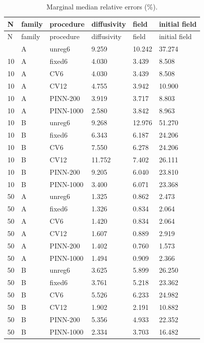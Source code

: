 \documentclass[10pt,a4paper]{article}
\begin{document}
\begingroup\small
\setlength{\tabcolsep}{3pt}
\begin{longtable}{@{}p{}p{}p{}p{}p{}p{}@{}}
\caption{Marginal median relative errors (\%).}\label{tab:1}\\
\toprule
N & family & procedure & diffusivity & field & initial field \\
\midrule\endfirsthead
\toprule
N & family & procedure & diffusivity & field & initial field \\
\midrule\endhead
\bottomrule\endfoot
10 & A & unreg6 & 9.259 & 10.242 & 37.274 \\
10 & A & fixed6 & 4.030 & 3.439 & 8.508 \\
10 & A & CV6 & 4.030 & 3.439 & 8.508 \\
10 & A & CV12 & 4.755 & 3.942 & 10.900 \\
10 & A & PINN-200 & 3.919 & 3.717 & 8.803 \\
10 & A & PINN-1000 & 2.580 & 3.842 & 8.963 \\
10 & B & unreg6 & 9.268 & 12.976 & 51.270 \\
10 & B & fixed6 & 6.343 & 6.187 & 24.206 \\
10 & B & CV6 & 7.550 & 6.278 & 24.206 \\
10 & B & CV12 & 11.752 & 7.402 & 26.111 \\
10 & B & PINN-200 & 9.205 & 6.040 & 23.810 \\
10 & B & PINN-1000 & 3.400 & 6.071 & 23.368 \\
50 & A & unreg6 & 1.325 & 0.862 & 2.473 \\
50 & A & fixed6 & 1.326 & 0.834 & 2.064 \\
50 & A & CV6 & 1.420 & 0.834 & 2.064 \\
50 & A & CV12 & 1.607 & 0.889 & 2.919 \\
50 & A & PINN-200 & 1.402 & 0.760 & 1.573 \\
50 & A & PINN-1000 & 1.494 & 0.909 & 2.366 \\
50 & B & unreg6 & 3.625 & 5.899 & 26.250 \\
50 & B & fixed6 & 3.761 & 5.218 & 23.362 \\
50 & B & CV6 & 5.526 & 6.233 & 24.982 \\
50 & B & CV12 & 1.902 & 2.191 & 10.882 \\
50 & B & PINN-200 & 5.356 & 4.933 & 22.352 \\
50 & B & PINN-1000 & 2.334 & 3.703 & 16.482 \\
\end{longtable}
\endgroup
\end{document}
